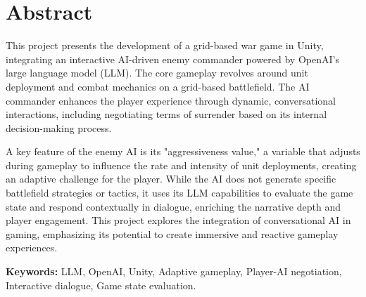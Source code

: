 \chapter*{Abstract}

This project presents the development of a grid-based war game in Unity, integrating an interactive AI-driven enemy commander powered by OpenAI's large language model (LLM). The core gameplay revolves around unit deployment and combat mechanics on a grid-based battlefield. The AI commander enhances the player experience through dynamic, conversational interactions, including negotiating terms of surrender based on its internal decision-making process.

A key feature of the enemy AI is its "aggressiveness value," a variable that adjusts during gameplay to influence the rate and intensity of unit deployments, creating an adaptive challenge for the player. While the AI does not generate specific battlefield strategies or tactics, it uses its LLM capabilities to evaluate the game state and respond contextually in dialogue, enriching the narrative depth and player engagement. This project explores the integration of conversational AI in gaming, emphasizing its potential to create immersive and reactive gameplay experiences.

\vfill
\textbf{Keywords:} LLM, OpenAI, Unity, Adaptive gameplay, Player-AI negotiation, Interactive dialogue, Game state evaluation.
\clearpage